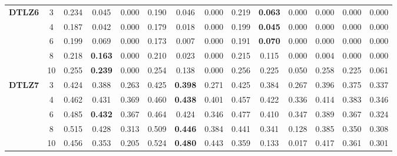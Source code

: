\documentclass[onecolumn,10pt]{asme2ej}
\begin{document}
\begin{table}[!htb]
\begin{tabular}{|c|c|c|c|c|c|c|c|c|c|c|c|c|c|}
	\multirow{5}{*}{\textbf{DTLZ6}} & 3          & 0.234         & 0.045          & 0.000          & 0.190         & 0.046          & 0.000          & 0.219         & \textbf{0.063} & 0.000          & 0.000         & 0.000          & 0.000          \\ \cline{2-14} 
	& 4          & 0.187         & 0.042          & 0.000          & 0.179         & 0.018          & 0.000          & 0.199         & \textbf{0.045} & 0.000          & 0.000         & 0.000          & 0.000          \\ \cline{2-14} 
	& 6          & 0.199         & 0.069          & 0.000          & 0.173         & 0.007          & 0.000          & 0.191         & \textbf{0.070} & 0.000          & 0.000         & 0.000          & 0.000          \\ \cline{2-14} 
	& 8          & 0.218         & \textbf{0.163} & 0.000          & 0.210         & 0.023          & 0.000          & 0.215         & 0.115          & 0.000          & 0.004         & 0.000          & 0.000          \\ \cline{2-14} 
	& 10         & 0.255         & \textbf{0.239} & 0.000          & 0.254         & 0.138          & 0.000          & 0.256         & 0.225          & 0.050          & 0.258         & 0.225          & 0.061          \\ \hline
	\multirow{5}{*}{\textbf{DTLZ7}} & 3          & 0.424         & 0.388          & 0.263          & 0.425         & \textbf{0.398} & 0.271          & 0.425         & 0.384          & 0.267          & 0.396         & 0.375          & 0.337          \\ \cline{2-14} 
	& 4          & 0.462         & 0.431          & 0.369          & 0.460         & \textbf{0.438} & 0.401          & 0.457         & 0.422          & 0.336          & 0.414         & 0.383          & 0.346          \\ \cline{2-14} 
	& 6          & 0.485         & \textbf{0.432} & 0.367          & 0.464         & 0.424          & 0.346          & 0.477         & 0.410          & 0.347          & 0.389         & 0.367          & 0.324          \\ \cline{2-14} 
	& 8          & 0.515         & 0.428          & 0.313          & 0.509         & \textbf{0.446} & 0.384          & 0.441         & 0.341          & 0.128          & 0.385         & 0.350          & 0.308          \\ \cline{2-14} 
	& 10         & 0.456         & 0.353          & 0.205          & 0.524         & \textbf{0.480} & 0.443          & 0.359         & 0.133          & 0.017          & 0.417         & 0.361          & 0.301          \\ \hline
	\end{tabular}
\end{table}
\end{document}
